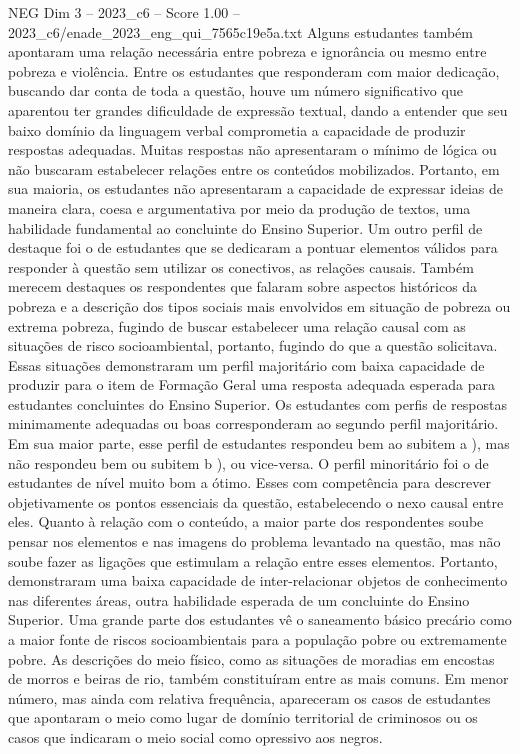 \begin{textsample}{NEG Dim 3 – 2023\_c6 – Score 1.00 – 2023\_c6/enade\_2023\_eng\_qui\_7565c19e5a.txt}
Alguns estudantes também apontaram uma relação necessária entre pobreza e ignorância ou mesmo entre pobreza e violência.
Entre os estudantes que responderam com maior dedicação, buscando dar conta de toda a questão, houve um número significativo que aparentou ter grandes dificuldade de expressão textual, dando a entender que seu baixo domínio da linguagem verbal comprometia a capacidade de produzir respostas adequadas.
Muitas respostas não apresentaram o mínimo de lógica ou não buscaram estabelecer relações entre os conteúdos mobilizados.
Portanto, em sua maioria, os estudantes não apresentaram a capacidade de expressar ideias de maneira clara, coesa e argumentativa por meio da produção de textos, uma habilidade fundamental ao concluinte do Ensino Superior.
Um outro perfil de destaque foi o de estudantes que se dedicaram a pontuar elementos válidos para responder à questão sem utilizar os conectivos, as relações causais.
Também merecem destaques os respondentes que falaram sobre aspectos históricos da pobreza e a descrição dos tipos sociais mais envolvidos em situação de pobreza ou extrema pobreza, fugindo de buscar estabelecer uma relação causal com as situações de risco socioambiental, portanto, fugindo do que a questão solicitava.
Essas situações demonstraram um perfil majoritário com baixa capacidade de produzir para o item de Formação Geral uma resposta adequada esperada para estudantes concluintes do Ensino Superior.
Os estudantes com perfis de respostas minimamente adequadas ou boas corresponderam ao segundo perfil majoritário.
Em sua maior parte, esse perfil de estudantes respondeu bem ao subitem a ), mas não respondeu bem ou subitem b ), ou vice-versa.
O perfil minoritário foi o de estudantes de nível muito bom a ótimo.
Esses com competência para descrever objetivamente os pontos essenciais da questão, estabelecendo o nexo causal entre eles.
Quanto à relação com o conteúdo, a maior parte dos respondentes soube pensar nos elementos e nas imagens do problema levantado na questão, mas não soube fazer as ligações que estimulam a relação entre esses elementos.
Portanto, demonstraram uma baixa capacidade de inter-relacionar objetos de conhecimento nas diferentes áreas, outra habilidade esperada de um concluinte do Ensino Superior.
Uma grande parte dos estudantes vê o saneamento básico precário como a maior fonte de riscos socioambientais para a população pobre ou extremamente pobre.
As descrições do meio físico, como as situações de moradias em encostas de morros e beiras de rio, também constituíram entre as mais comuns.
Em menor número, mas ainda com relativa frequência, apareceram os casos de estudantes que apontaram o meio como lugar de domínio territorial de criminosos ou os casos que indicaram o meio social como opressivo aos negros.

\end{textsample}
